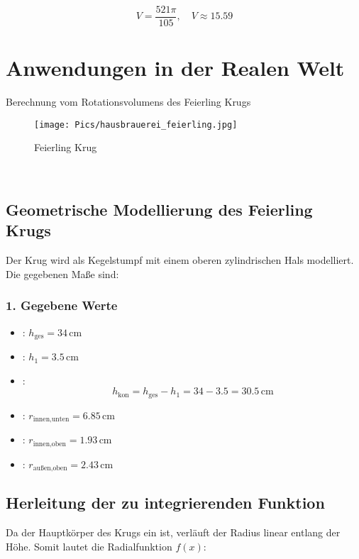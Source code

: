 \documentclass[a4paper,final]{report}
\begin{document}
\[
V = \frac{521\pi}{105}, \quad V \approx 15.59
\]
\chapter{Anwendungen in der Realen Welt}
Berechnung vom Rotationsvolumens des Feierling Krugs
\begin{figure}[h]
    \centering
    \texttt{[image: Pics/hausbrauerei\_feierling.jpg]}
    \caption{Feierling Krug}
    \label{fig:enter-label}
\end{figure}
\\
\cite{feierling_krug_bild}

\section{Geometrische Modellierung des Feierling Krugs}
Der Krug wird als Kegelstumpf mit einem oberen zylindrischen Hals modelliert.  Die gegebenen Maße sind:

\subsection{1. Gegebene Werte}
\begin{itemize}
    \item {}: \( h_{\text{ges}} = 34 \, \text{cm} \)
    \item {}: \( h_1 = 3.5 \, \text{cm} \)
    \item {}:  
          \[
          h_{\text{kon}} = h_{\text{ges}} - h_1 = 34 - 3.5 = 30.5 \, \text{cm}
          \]
    \item {}: \( r_{\text{innen,unten}} = 6.85 \, \text{cm} \)
    \item {}: \( r_{\text{innen,oben}} = 1.93 \, \text{cm} \)
    \item {}: \( r_{\text{außen,oben}} = 2.43 \, \text{cm} \)
\end{itemize}

\section{Herleitung der zu integrierenden Funktion}

Da der Hauptkörper des Krugs ein  ist, verläuft der Radius linear entlang der Höhe. Somit lautet die Radialfunktion \( f(x) \):
\end{document}
